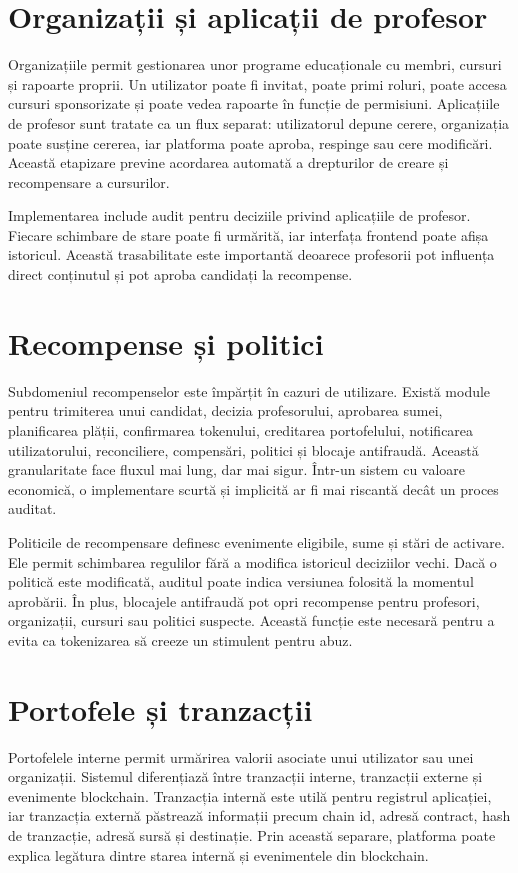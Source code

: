 \section{Organizații și aplicații de profesor}
Organizațiile permit gestionarea unor programe educaționale cu membri, cursuri și rapoarte proprii. Un utilizator poate fi invitat, poate primi roluri, poate accesa cursuri sponsorizate și poate vedea rapoarte în funcție de permisiuni. Aplicațiile de profesor sunt tratate ca un flux separat: utilizatorul depune cerere, organizația poate susține cererea, iar platforma poate aproba, respinge sau cere modificări. Această etapizare previne acordarea automată a drepturilor de creare și recompensare a cursurilor.

Implementarea include audit pentru deciziile privind aplicațiile de profesor. Fiecare schimbare de stare poate fi urmărită, iar interfața frontend poate afișa istoricul. Această trasabilitate este importantă deoarece profesorii pot influența direct conținutul și pot aproba candidați la recompense.

\section{Recompense și politici}
Subdomeniul recompenselor este împărțit în cazuri de utilizare. Există module pentru trimiterea unui candidat, decizia profesorului, aprobarea sumei, planificarea plății, confirmarea tokenului, creditarea portofelului, notificarea utilizatorului, reconciliere, compensări, politici și blocaje antifraudă. Această granularitate face fluxul mai lung, dar mai sigur. Într-un sistem cu valoare economică, o implementare scurtă și implicită ar fi mai riscantă decât un proces auditat.

Politicile de recompensare definesc evenimente eligibile, sume și stări de activare. Ele permit schimbarea regulilor fără a modifica istoricul deciziilor vechi. Dacă o politică este modificată, auditul poate indica versiunea folosită la momentul aprobării. În plus, blocajele antifraudă pot opri recompense pentru profesori, organizații, cursuri sau politici suspecte. Această funcție este necesară pentru a evita ca tokenizarea să creeze un stimulent pentru abuz.

\section{Portofele și tranzacții}
Portofelele interne permit urmărirea valorii asociate unui utilizator sau unei organizații. Sistemul diferențiază între tranzacții interne, tranzacții externe și evenimente blockchain. Tranzacția internă este utilă pentru registrul aplicației, iar tranzacția externă păstrează informații precum chain id, adresă contract, hash de tranzacție, adresă sursă și destinație. Prin această separare, platforma poate explica legătura dintre starea internă și evenimentele din blockchain.

